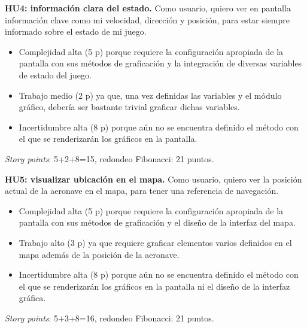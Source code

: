 \documentclass[
11pt, %
]{charter}
\begin{document}

	\textbf{HU4: información clara del estado.} Como usuario, quiero ver en pantalla información clave como mi velocidad, dirección y posición, para estar siempre informado sobre el estado de mi juego.

	\begin{itemize}
		\item Complejidad alta (5 p) porque requiere la configuración apropiada de la pantalla con sus métodos de graficación y la integración de diversas variables de estado del juego.
		\item Trabajo medio (2 p) ya que, una vez definidas las variables y el módulo gráfico, debería ser bastante trivial graficar dichas variables. 
		\item Incertidumbre alta (8 p) porque aún no se encuentra definido el método con el que se renderizarán los gráficos en la pantalla. 
	\end{itemize}
	\textit{Story points}: 5+2+8=15, redondeo Fibonacci: 21 puntos.
		
	\textbf{HU5: visualizar ubicación en el mapa.} Como usuario, quiero ver la posición actual de la aeronave en el mapa, para tener una referencia de navegación.

	\begin{itemize}
		\item Complejidad alta (5 p) porque requiere la configuración apropiada de la pantalla con sus métodos de graficación y el diseño de la interfaz del mapa.
		\item Trabajo alto (3 p) ya que requiere graficar elementos varios definidos en el mapa además de la posición de la aeronave. 
		\item Incertidumbre alta (8 p) porque aún no se encuentra definido el método con el que se renderizarán los gráficos en la pantalla ni el diseño de la interfaz gráfica. 
	\end{itemize}
	\textit{Story points}: 5+3+8=16, redondeo Fibonacci: 21 puntos.
		
\end{document}
